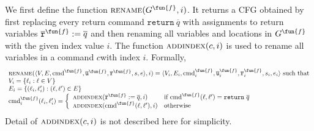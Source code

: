 We first define the function $\textsc{rename}(G^\fun{f},i)$.
It returns a CFG obtained by first replacing every return command
$\mathtt{return}\ \overline{q}$ with assignments to return variables
$\overline{\texttt{r}}^\fun{f} := \overline{q}$ and then renaming all variables
and locations in $G^\fun{f}$ with the given index value $i$.
The function $\textsc{addindex}(c, i)$ is used to rename all variables in a
command $c$with index $i$.
Formally,
\[
\begin{array}{l}
\textsc{rename}(\langle V, E,\textmd{cmd}^\fun{f},\overline{\texttt{u}}^\fun{f},
\overline{\texttt{r}}^\fun{f},s,e \rangle,i)
= \langle V_i, E_i,\textmd{cmd}_i^\fun{f},\overline{\texttt{u}}_i^\fun{f},
\overline{\texttt{r}}_i^\fun{f},s_i,e_i \rangle \text{ such that}\\

V_i = \{\ell_i:\ell \in V\} \\

E_i = \{(\ell_i,\ell'_i): (\ell,\ell') \in E\} \\

\textmd{cmd}_i^\fun{f}(\ell_i,\ell'_i) =
  \left\{
  \begin{array}{ll}
   \textsc{addindex}(\overline{\texttt{r}}^\fun{f}:=\overline{q}, i) &
     \text{if }\textmd{cmd}^\fun{f}(\ell,\ell')=\mathtt{return}\ \overline{q} \\
   \textsc{addindex}(\textmd{cmd}^\fun{f}(\ell,\ell'), i) &
     \text{otherwise}
  \end{array}
  \right.
\end{array}
\]
Detail of $\textsc{addindex}(c, i)$ is not described here for simplicity.

